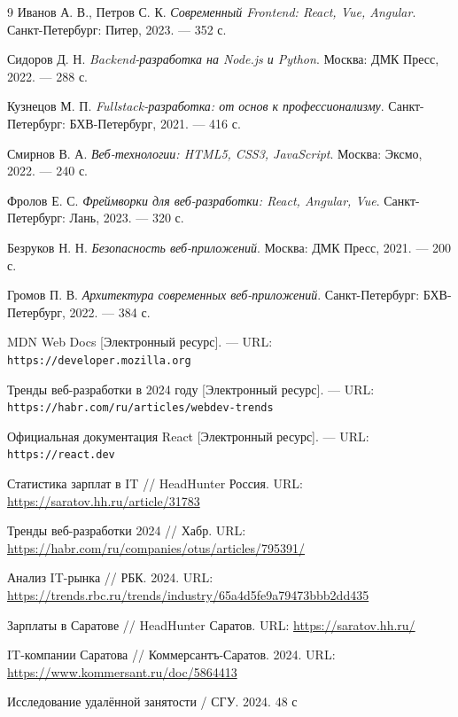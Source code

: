 \documentclass[referat]{SCWorks}
\begin{document}
\begin{thebibliography}{9}
Иванов А. В., Петров С. К. 
\textit{Современный Frontend: React, Vue, Angular}. 
Санкт-Петербург: Питер, 2023. — 352 с.

Сидоров Д. Н. 
\textit{Backend-разработка на Node.js и Python}. 
Москва: ДМК Пресс, 2022. — 288 с.

Кузнецов М. П. 
\textit{Fullstack-разработка: от основ к профессионализму}. 
Санкт-Петербург: БХВ-Петербург, 2021. — 416 с.

Смирнов В. А. 
\textit{Веб-технологии: HTML5, CSS3, JavaScript}. 
Москва: Эксмо, 2022. — 240 с.

Фролов Е. С. 
\textit{Фреймворки для веб-разработки: React, Angular, Vue}. 
Санкт-Петербург: Лань, 2023. — 320 с.

Безруков Н. Н. 
\textit{Безопасность веб-приложений}. 
Москва: ДМК Пресс, 2021. — 200 с.

Громов П. В. 
\textit{Архитектура современных веб-приложений}. 
Санкт-Петербург: БХВ-Петербург, 2022. — 384 с.

MDN Web Docs [Электронный ресурс]. — URL: \texttt{https://developer.mozilla.org} 

Тренды веб-разработки в 2024 году [Электронный ресурс]. — URL: \texttt{https://habr.com/ru/articles/webdev-trends} 

Официальная документация React [Электронный ресурс]. — URL: \texttt{https://react.dev} 

Статистика зарплат в IT // HeadHunter Россия. URL: \url{https://saratov.hh.ru/article/31783} 

Тренды веб-разработки 2024 // Хабр. URL: \url{https://habr.com/ru/companies/otus/articles/795391/} 

Анализ IT-рынка // РБК. 2024. URL: \url{https://trends.rbc.ru/trends/industry/65a4d5fe9a79473bbb2dd435}

Зарплаты в Саратове // HeadHunter Саратов. URL: \url{https://saratov.hh.ru/}

IT-компании Саратова // Коммерсантъ-Саратов. 2024. URL: \url{https://www.kommersant.ru/doc/5864413} 

Исследование удалённой занятости / СГУ. 2024. 48 с
\end{thebibliography}







\appendix
\end{document}
